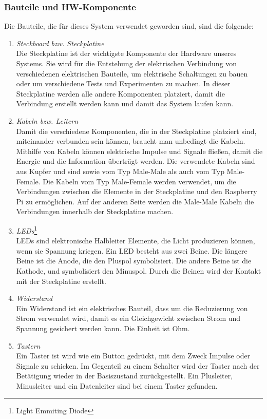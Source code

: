 		\subsubsection{Bauteile und HW-Komponente}
		Die Bauteile, die für dieses System verwendet geworden sind, sind die folgende:
\begin{enumerate}
	\item \textit{Steckboard bzw. Steckplatine}\\ 
Die Steckplatine ist der wichtigste Komponente der Hardware unseres Systems. Sie wird für die Entstehung der elektrischen Verbindung von verschiedenen elektrischen Bauteile, um elektrische Schaltungen zu bauen oder um verschiedene Tests und Experimenten zu machen. In dieser Steckplatine werden alle andere Komponenten platziert, damit die Verbindung erstellt werden kann und damit das System laufen kann.
	\item \textit{Kabeln bzw. Leitern} \\
Damit die verschiedene Komponenten, die in der Steckplatine platziert sind, miteinander verbunden sein können, braucht man unbedingt die Kabeln. Mithilfe von Kabeln können elektrische Impulse und Signale fließen, damit die Energie und die Information überträgt werden. Die verwendete Kabeln sind aus Kupfer und sind sowie vom Typ Male-Male als auch vom Typ Male-Female. Die Kabeln vom Typ Male-Female werden verwendet, um die Verbindungen zwischen die Elemente in der Steckplatine und den Raspberry Pi zu ermöglichen. Auf der anderen Seite werden die Male-Male Kabeln die Verbindungen innerhalb der Steckplatine machen.
	\item \textit{LEDs}\footnote{Light Emmiting Diode} \\
LEDs sind elektronische Halbleiter Elemente, die Licht produzieren können, wenn sie Spannung kriegen. Ein LED besteht aus zwei Beine. Die längere Beine ist die Anode, die den Pluspol symbolisiert. Die andere Beine ist die Kathode, und symbolisiert den Minuspol. Durch die Beinen wird der Kontakt mit der Steckplatine erstellt.
	\item \textit{Widerstand} \\
Ein Widerstand ist ein elektrisches Bauteil, dass um die Reduzierung von Strom verwendet wird, damit es ein Gleichgewicht zwischen Strom und Spannung gesichert werden kann. Die Einheit ist Ohm.
	\item \textit{Tastern} \\
Ein Taster ist wird wie ein Button gedrückt, mit dem Zweck Impulse oder Signale zu schicken. Im Gegenteil zu einem Schalter wird der Taster nach der Betätigung  wieder in der Basiszustand zurückgestellt. Ein Plusleiter, Minusleiter und ein Datenleiter sind bei einem Taster gefunden.

\end{enumerate}
